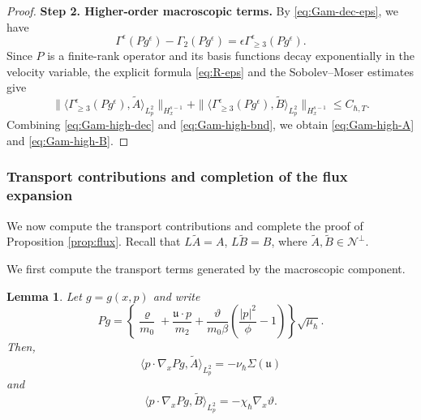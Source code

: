 \documentclass[10pt,reqno]{amsart}
\numberwithin{equation}{section}
\newtheorem{lemma}{Lemma}[section]
\newcommand{\lt}{\left}
\newcommand{\rt}{\right}
\newcommand{\lal}{\langle}
\newcommand{\ral}{\rangle}
\newcommand{\vrh}{\varrho}
\newcommand{\vth}{\vartheta}
\newcommand{\mfu}{\mathfrak{u}}
\newcommand{\bq}{\begin{equation}}
\newcommand{\eq}{\end{equation}}
\newcommand{\calN}{\mathcal N}
\begin{document}
\begin{proof}
\medskip
\noindent
\textbf{Step 2. Higher-order macroscopic terms.}
By \eqref{eq:Gam-dec-eps}, we have
\bq\label{eq:Gam-high-dec}
\Gamma^\epsilon ( P g^\epsilon ) - \Gamma_2  ( P g^\epsilon ) = \epsilon \Gamma^\epsilon_{\ge3} ( P g^\epsilon ).
\eq
Since $P$ is a finite-rank operator and its basis functions decay exponentially in the velocity variable, the explicit formula \eqref{eq:R-eps} and the Sobolev--Moser estimates give
\bq\label{eq:Gam-high-bnd}
\| \lal \Gamma^\epsilon_{\ge3} ( P g^\epsilon ), \widetilde A  \ral_{L^2_p} \|_{H^{s-1}_x} + \| \lal \Gamma^\epsilon_{\ge3} ( P g^\epsilon ), \widetilde B  \ral_{L^2_p} \|_{H^{s-1}_x} \le C_{\hbar,T}.
\eq
Combining \eqref{eq:Gam-high-dec} and \eqref{eq:Gam-high-bnd}, we obtain \eqref{eq:Gam-high-A} and \eqref{eq:Gam-high-B}.
\end{proof}

 
%
%
%
%
%
%
%
%
%
%
\subsubsection{Transport contributions and completion of the flux expansion}

We now compute the transport contributions and complete the proof of Proposition \ref{prop:flux}. Recall that $L \widetilde A =A$, $L \widetilde B =B$, where $\widetilde A ,\widetilde B \in\calN^\perp$.

We first compute the transport terms generated by the macroscopic component.

\begin{lemma}\label{lem:tr-flux}
Let $g=g(x,p)$ and write
\[
P g=\lt\{\frac{\vrh}{m_0 }+\frac{\mfu\cdot p}{m_2 }+\frac{\vth}{m_0\beta}\lt(\frac{|p|^2}{\phi }-1\rt)\rt\}\sqrt{\mu_\hbar}.
\]
Then,
\bq\label{eq:A-tr-app}
\lal p\cdot\nabla_xP g,\widetilde A \ral_{L^2_p}=-\nu_\hbar\Sigma(\mfu)
\eq
and
\bq\label{eq:B-tr-app}
\lal p\cdot\nabla_xP g,\widetilde B \ral_{L^2_p}=-\chi_\hbar\nabla_x\vth.
\eq
\end{lemma}
\end{document}
